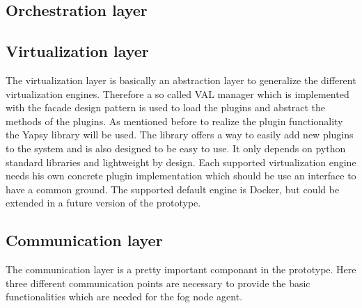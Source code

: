 \subsection{Orchestration layer}
\doit

\subsection{Virtualization layer}
The virtualization layer is basically an abstraction layer to generalize the different virtualization engines.
Therefore a so called \ac{VAL} manager which is implemented with the facade design pattern is used to load the plugins and abstract the methods of the plugins.
As mentioned before to realize the plugin functionality the Yapsy library will be used.
The library offers a way to easily add new plugins to the system and is also designed to be easy to use.
It only depends on python standard libraries and lightweight by design.
Each supported virtualization engine needs his own concrete plugin implementation which should be use an interface to have a common ground.
The supported default engine is Docker, but could be extended in a future version of the prototype.

\subsection{Communication layer}
The communication layer is a pretty important componant in the prototype.
Here three different communication points are necessary to provide the basic functionalities which are needed for the fog node agent.

